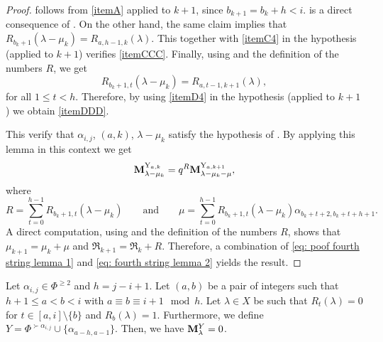 \begin{proof}
  follows from \cref{itemA} applied to $k+1$, since $b_{k+1} = b_{k} + h < i$.
  is a direct consequence of  . 
On the other hand, the same claim implies that  $R_{b_k+1}(\lambda-\mu_k) =R_{a,h-1,k}(\lambda)$. 
This together with \cref{itemC4} in the hypothesis (applied to $k+1$) verifies \cref{itemCCC}. 
Finally, using   and the definition of the numbers $R$, we get
\begin{equation}
   R_{b_k+1,t}(\lambda -\mu_k) =   R_{a,t-1,k+1}(\lambda),
\end{equation}
for all $1\leq t < h$. 
Therefore,  by using \cref{itemD4} in the hypothesis (applied to $k+1$) we obtain  \cref{itemDDD}.

This verify that $\alpha_{i,j}$, $(a,k)$, $\lambda - \mu_{k}$ satisfy the hypothesis of . By applying this lemma in this context we get
\begin{equation}\label{eq: fourth string lemma 2}
    \mathbf{M}_{\lambda - \mu_{k}}^{\mathrm{Y}_{a,k}} = q^{R}\mathbf{M}_{\lambda - \mu_{k} - \mu}^{\mathrm{Y}_{a,k+1}},
\end{equation}
where 
\begin{equation}
    R = \sum_{t=0}^{h-1} R_{b_{k}+1,t}(\lambda - \mu_{k}) \qquad \mbox{and} \qquad    \mu = \sum_{t=0}^{h-1}R_{b_{k}+1,t}(\lambda - \mu_{k})\alpha_{b_{k}+t+2,b_{k}+t+h+1}. 
\end{equation}
A direct computation, using  and the definition of the numbers $R$,   shows that $\mu_{k+1}=\mu_k +\mu $ and $\mathfrak{R}_{k+1}=\mathfrak{R}_k + R   $.
Therefore, a combination of \eqref{eq: poof fourth string lemma 1} and \eqref{eq: fourth string lemma 2}   yields the result.
\end{proof}



\begin{corollary}
\label{lem: primer paso PPPPPP}
Let $\alpha_{i,j} \in \Phi^{\geq 2}$ and $h=j-i+1$.
Let $(a,b)$ be a pair of integers such that $h+1\leq a < b < i$ with $a\equiv b\equiv i+1 \mod{h}$. 
Let  $\lambda\in X$ be such that  $R_t(\lambda) = 0$ for $t \in [a,i]\setminus \{b\}$ and $R_b(\lambda) = 1$.
Furthermore, we define  $Y=\Phi^{\succ\alpha_{i,j}}\cup \{\alpha_{a-h,a-1}\}$.
Then, we have $\mathbf{M}_{\lambda}^{Y} = 0$.
\end{corollary}



